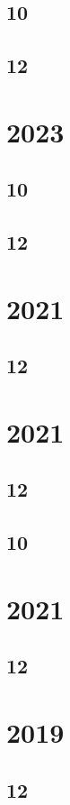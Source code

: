 \documentclass[11pt]{book}
\begin{document}
\subsection{10}

\subsection{12}

\section{2023}
\subsection{10}

\subsection{12}

\section{2021}
\subsection{12}

\section{2021}
\subsection{12}

\subsection{10}

\section{2021}
\subsection{12}

\section{2019}
\subsection{12}





\end{document}
